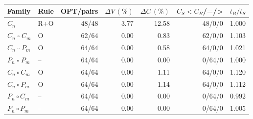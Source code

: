 \begin{tabular}{@{}llrrrrr@{}}
\toprule
Family & Rule & OPT/pairs & $\Delta V\,(\%)$ & $\Delta C\,(\%)$ & $C_S<C_B$/=/> & $t_B/t_S$\\
\midrule
$C_n$ & R+O & 48/48 & 3.77 & 12.58 & 48/0/0 & 1.000\\
$C_n\mathbin{\square}C_m$ & O & 62/64 & 0.00 & 0.83 & 62/0/0 & 1.103\\
$C_n\mathbin{\square}P_m$ & O & 64/64 & 0.00 & 0.58 & 64/0/0 & 1.021\\
$P_n\mathbin{\square}P_m$ & -- & 64/64 & 0.00 & 0.00 & 0/64/0 & 1.000\\
$C_n\circ C_m$ & O & 64/64 & 0.00 & 1.11 & 64/0/0 & 1.120\\
$C_n\circ P_m$ & O & 64/64 & 0.00 & 1.14 & 64/0/0 & 1.112\\
$P_n\circ C_m$ & -- & 64/64 & 0.00 & 0.00 & 0/64/0 & 0.992\\
$P_n\circ P_m$ & -- & 64/64 & 0.00 & 0.00 & 0/64/0 & 1.005\\
\bottomrule
\end{tabular}
